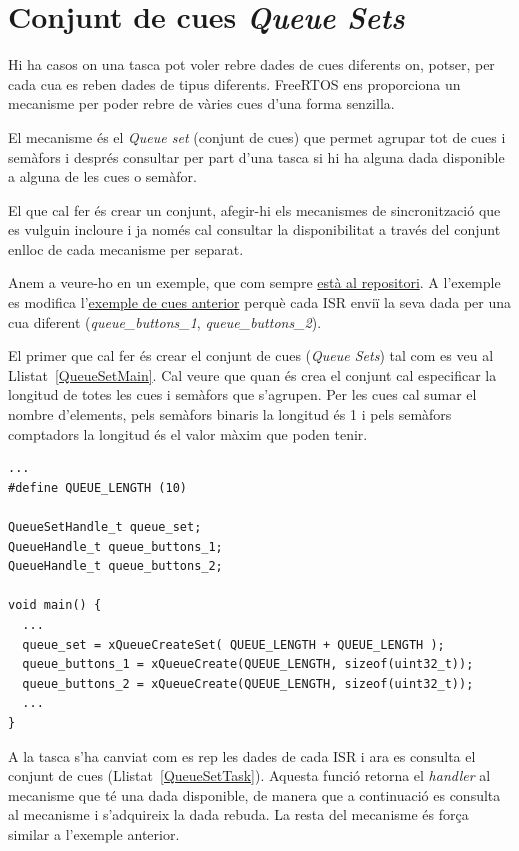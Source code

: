 \section{Conjunt de cues {\em Queue Sets}}
Hi ha casos on una tasca pot voler rebre dades de cues diferents on, potser, per cada cua es reben dades de tipus diferents. FreeRTOS ens proporciona un mecanisme per poder rebre de vàries cues d'una forma senzilla.

El mecanisme és el {\em Queue set} (conjunt de cues) que permet agrupar tot de cues i semàfors i després consultar per part d'una tasca si hi ha alguna dada disponible a alguna de les cues o semàfor.

El que cal fer és crear un conjunt, afegir-hi els mecanismes de sincronització que es vulguin incloure i ja només cal consultar la disponibilitat a través del conjunt enlloc de cada mecanisme per separat.

Anem a veure-ho en un exemple, que com sempre \href{https://github.com/mariusmm/cursembedded/tree/master/Simplicity/FreeRTOS_QueueSets}{està al repositori}.  A l'exemple es modifica l'\href{https://github.com/mariusmm/cursembedded/tree/master/Simplicity/FreeRTOS_Queue}{exemple de cues anterior} perquè cada ISR enviï la seva dada per una cua diferent ({\em queue\_buttons\_1}, {\em queue\_buttons\_2}).

El primer que cal fer és crear el conjunt de cues ({\em Queue Sets}) tal com es veu al Llistat~\ref{QueueSetMain}. Cal veure que quan és crea el conjunt cal especificar la longitud de totes les cues i semàfors que s'agrupen. Per les cues cal sumar el nombre d'elements, pels semàfors binaris la longitud és 1 i pels semàfors comptadors la longitud és el valor màxim que poden tenir.

\begin{lstlisting}[style=customc,caption={Creació del conjunt de cues}, label=QueueSetMain]
...
#define QUEUE_LENGTH (10)

QueueSetHandle_t queue_set;
QueueHandle_t queue_buttons_1;
QueueHandle_t queue_buttons_2;

void main() {
  ...
  queue_set = xQueueCreateSet( QUEUE_LENGTH + QUEUE_LENGTH );
  queue_buttons_1 = xQueueCreate(QUEUE_LENGTH, sizeof(uint32_t));  
  queue_buttons_2 = xQueueCreate(QUEUE_LENGTH, sizeof(uint32_t));
  ...
}
\end{lstlisting}

A la tasca s'ha canviat com es rep les dades de cada ISR i ara es consulta el conjunt de cues (Llistat~\ref{QueueSetTask}). Aquesta funció retorna el {\em handler} al mecanisme que té una dada disponible, de manera que a continuació es consulta al mecanisme i s'adquireix la dada rebuda. La resta del mecanisme és força similar a l'exemple anterior.

